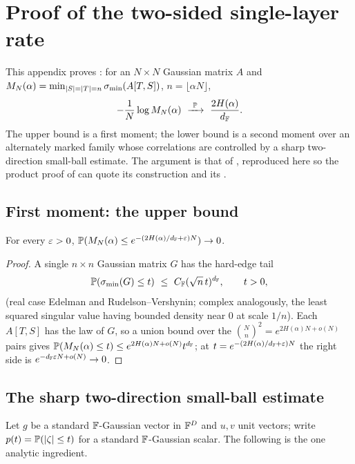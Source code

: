 \section{Proof of the two-sided single-layer rate}\label{app:twosided}

This appendix proves : for an $N\times N$ Gaussian matrix $A$ and
$M_N(\alpha)=\min_{|S|=|T|=n}\sigma_{\min}(A[T,S])$, $n=\lfloor\alpha N\rfloor$,
\[
  -\frac1N\log M_N(\alpha)\ \xrightarrow{\ \PP\ }\ \frac{2H(\alpha)}{\dF}.
\]
The upper bound is a first moment; the lower bound is a second moment over an alternately marked family
whose correlations are controlled by a sharp two-direction small-ball estimate. The argument is that of
\cite{shmaloSharp}, reproduced here so the product proof of  can quote its
construction and its .

\subsection{First moment: the upper bound}
\begin{proposition}\label{prop:upper}
For every $\varepsilon>0$, $\mathbb{P}(M_N(\alpha)\le e^{-(2H(\alpha)/d_{\mathbb{F}}+\varepsilon)N})\to0$.
\end{proposition}
\begin{proof}
A single $n\times n$ Gaussian matrix $G$ has the hard-edge tail
\begin{equation}\label{eq:hardedge}
  \mathbb{P}(\sigma_{\min}(G)\le t)\ \le\ C_{\mathbb{F}}(\sqrt n\,t)^{d_{\mathbb{F}}},\qquad t>0,
\end{equation}
(real case Edelman and Rudelson--Vershynin; complex analogously, the least squared singular value having
bounded density near $0$ at scale $1/n$). Each $A[T,S]$ has the law of $G$, so a union bound over the
$\binom Nn^2=e^{2H(\alpha)N+o(N)}$ pairs gives $\mathbb{P}(M_N(\alpha)\le t)\le e^{2H(\alpha)N+o(N)}t^{d_{\mathbb{F}}}$;
at $t=e^{-(2H(\alpha)/d_{\mathbb{F}}+\varepsilon)N}$ the right side is $e^{-d_{\mathbb{F}}\varepsilon N+o(N)}\to0$.
\end{proof}

\subsection{The sharp two-direction small-ball estimate}
Let $g$ be a standard $\mathbb{F}$-Gaussian vector in $\mathbb{F}^D$ and $u,v$ unit vectors; write
$p(t)=\mathbb{P}(|\zeta|\le t)$ for a standard $\mathbb{F}$-Gaussian scalar. The following is the one analytic
ingredient.

